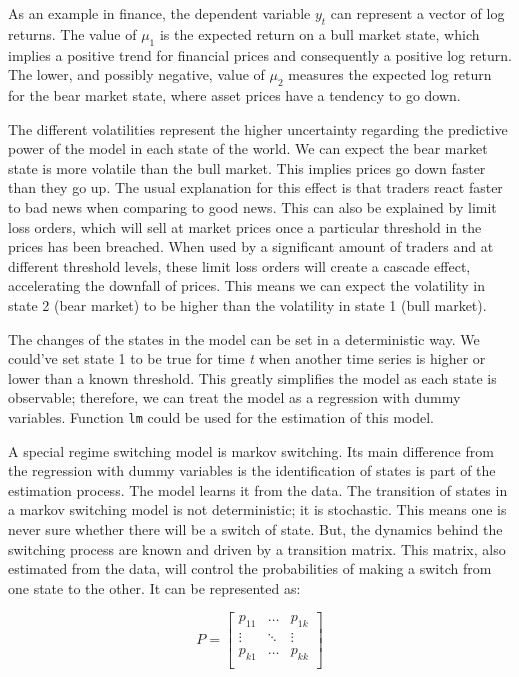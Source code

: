\documentclass[11pt,]{book}
\begin{document}
As an example in finance, the dependent variable \(y_t\) can represent a
vector of log returns. The value of \(\mu_{1}\) is the expected return
on a bull market state, which implies a positive trend for financial
prices and consequently a positive log return. The lower, and possibly
negative, value of \(\mu_{2}\) measures the expected log return for the
bear market state, where asset prices have a tendency to go down.

The different volatilities represent the higher uncertainty regarding
the predictive power of the model in each state of the world. We can
expect the bear market state is more volatile than the bull market. This
implies prices go down faster than they go up. The usual explanation for
this effect is that traders react faster to bad news when comparing to
good news. This can also be explained by limit loss orders, which will
sell at market prices once a particular threshold in the prices has been
breached. When used by a significant amount of traders and at different
threshold levels, these limit loss orders will create a cascade effect,
accelerating the downfall of prices. This means we can expect the
volatility in state 2 (bear market) to be higher than the volatility in
state 1 (bull market).

The changes of the states in the model can be set in a deterministic
way. We could've set state 1 to be true for time \emph{t} when another
time series is higher or lower than a known threshold. This greatly
simplifies the model as each state is observable; therefore, we can
treat the model as a regression with dummy variables. Function
\texttt{lm} could be used for the estimation of this model.

A special regime switching model is markov switching. Its main
difference from the regression with dummy variables is the
identification of states is part of the estimation process. The model
learns it from the data. The transition of states in a markov switching
model is not deterministic; it is stochastic. This means one is never
sure whether there will be a switch of state. But, the dynamics behind
the switching process are known and driven by a transition matrix. This
matrix, also estimated from the data, will control the probabilities of
making a switch from one state to the other. It can be represented as:

\begin{equation*}
P=\left[ \begin{array}{ccc}
p_{11} & \ldots & p_{1k} \\
\vdots & \ddots & \vdots \\
p_{k1} & \ldots & p_{kk} \\
\end{array} \right ]        
\end{equation*}
\end{document}

